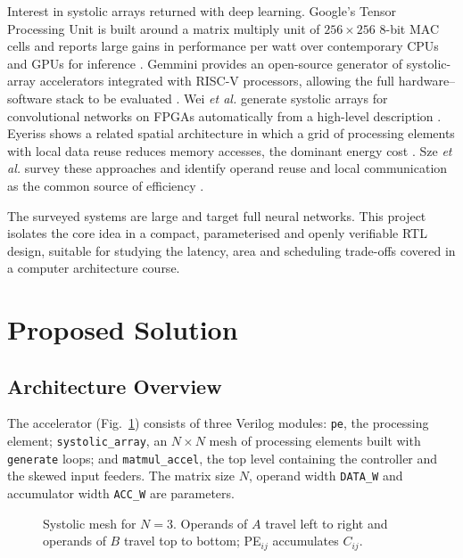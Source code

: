 \documentclass[conference]{IEEEtran}
\begin{document}
Interest in systolic arrays returned with deep learning. Google's Tensor
Processing Unit is built around a matrix multiply unit of $256 \times 256$
8-bit MAC cells and reports large gains in performance per watt over
contemporary CPUs and GPUs for inference \cite{tpu}. Gemmini provides an
open-source generator of systolic-array accelerators integrated with RISC-V
processors, allowing the full hardware--software stack to be evaluated
\cite{gemmini}. Wei \emph{et al.} generate systolic arrays for convolutional
networks on FPGAs automatically from a high-level description \cite{wei}.
Eyeriss shows a related spatial architecture in which a grid of processing
elements with local data reuse reduces memory accesses, the dominant energy
cost \cite{eyeriss}. Sze \emph{et al.} survey these approaches and identify
operand reuse and local communication as the common source of efficiency
\cite{sze}.

The surveyed systems are large and target full neural networks. This project
isolates the core idea in a compact, parameterised and openly verifiable RTL
design, suitable for studying the latency, area and scheduling trade-offs
covered in a computer architecture course.

\section{Proposed Solution}
\subsection{Architecture Overview}
The accelerator (Fig.~\ref{fig:array}) consists of three Verilog modules:
\texttt{pe}, the processing element; \texttt{systolic\_array}, an $N \times N$
mesh of processing elements built with \texttt{generate} loops; and
\texttt{matmul\_accel}, the top level containing the controller and the skewed
input feeders. The matrix size $N$, operand width \texttt{DATA\_W} and
accumulator width \texttt{ACC\_W} are parameters.

\begin{figure}[t]
\centering
{}
\caption{Systolic mesh for $N=3$. Operands of $A$ travel left to right and
operands of $B$ travel top to bottom; PE$_{ij}$ accumulates $C_{ij}$.}
\label{fig:array}
\end{figure}
\end{document}
